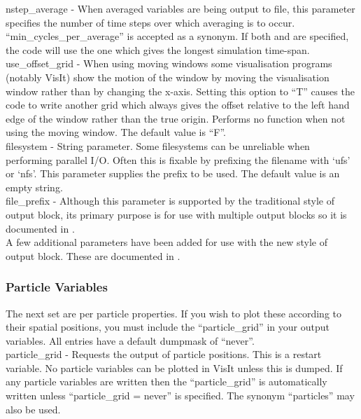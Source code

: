 {\emphtext nstep\_average} - When averaged variables are being output to
file, this parameter specifies the number of time steps over which
averaging is to occur. ``min\_cycles\_per\_average'' is accepted as a synonym.
If both  and  are specified,
the code will use the one which gives the longest simulation time-span.\\

{\emphtext use\_offset\_grid} - When using moving windows some visualisation
programs (notably VisIt) show the motion of the window by moving the
visualisation window rather than by changing the x-axis. Setting this option to
``T'' causes the code to write another grid which always gives the offset
relative to the left hand edge of the window rather than the true origin.
Performs no function when not using the moving window. The default value
is ``F''.\\

{\emphtext filesystem} - String parameter. Some filesystems can be unreliable
when performing parallel I/O. Often this is fixable by prefixing the filename
with `ufs' or `nfs'. This parameter supplies the prefix to be used. The
default value is an empty string.\\

{\emphtext file\_prefix} - Although this parameter is supported by the
traditional style of output block, its primary purpose is for use with
multiple output blocks so it is documented in .\\

A few additional parameters have been added for use with the new style of
output block. These are documented in .

\subsubsection{Particle Variables}
The next set are per particle properties. If you wish to plot these according
to their spatial positions, you must include the ``particle\_grid'' in your
output variables. All entries have a default dumpmask of ``never''.\\

{\emphtext particle\_grid} - Requests the output of particle positions. This
is a restart variable. No particle variables can be plotted in VisIt unless
this is dumped. If any particle variables are written then the
``particle\_grid'' is automatically written unless ``particle\_grid = never''
is specified.
The synonym ``particles'' may also be used.\\

